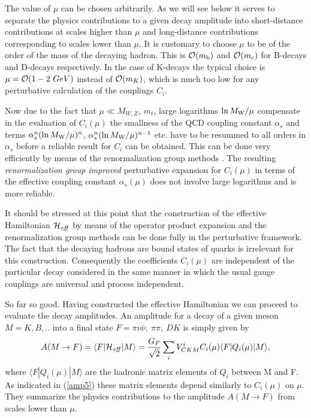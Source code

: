 \documentclass[12pt]{article}
\newcommand{\mc}{m_{\rm c}}
\newcommand{\mb}{m_{\rm b}}
\newcommand{\mw}{M_{\rm W}}
\newcommand{\be}{\begin{equation}}
\newcommand{\ee}{\end{equation}}
\newcommand{\ord}{{\cal O}}
\begin{document}
The value of $\mu$ can be chosen arbitrarily. As we will see below it serves 
to separate the physics contributions to a given decay amplitude into
short-distance contributions at scales higher than $\mu$ and long-distance
contributions corresponding to scales lower than $\mu$. It is customary 
to choose
$\mu$ to be of the order of the mass of the decaying hadron. 
This is $\ord (\mb)$ and $\ord(\mc)$ for B-decays and
D-decays respectively. In the case of K-decays the typical choice is
 $\mu=\ord(1-2~GeV)$
instead of $\ord(m_K)$, which is much too low for any perturbative 
calculation of the couplings $C_i$.

Now due to the fact that $\mu\ll  M_{W,Z},~ m_t$, large logarithms 
$\ln\mw/\mu$ compensate in the evaluation of
$C_i(\mu)$ the smallness of the QCD coupling constant $\alpha_s$ and 
terms $\alpha^n_s (\ln\mw/\mu)^n$, $\alpha^n_s (\ln\mw/\mu)^{n-1}$ 
etc. have to be resummed to all orders in $\alpha_s$ before a reliable 
result for $C_i$ can be obtained.
This can be done very efficiently by means of the renormalization group
methods \cite{REGM,HV1,Weinberg}. 
The resulting {\it renormalization group improved} perturbative
expansion for $C_i(\mu)$ in terms of the effective coupling constant 
$\alpha_s(\mu)$ does not involve large logarithms and is more reliable.

It should be stressed at this point that the construction of the effective
Hamiltonian ${\cal H}_{\it eff}$ by means of the operator product expansion and 
the
renormalization group methods can be done fully in the perturbative framework.
The fact that the decaying hadrons are bound states of quarks is irrelevant
for this construction. Consequently the coefficients $C_i(\mu)$ are 
independent of the
particular decay considered in the same manner in which the usual gauge
couplings are universal and process independent.

So far so good. Having constructed the effective Hamiltonian we can proceed
to evaluate the decay amplitudes. An amplitude for a decay of a given meson 
$M= K, B,..$ into a final state $F=\pi\nu\bar\nu,~\pi\pi,~DK$ is simply 
given by
\be\label{amp5}
A(M\to F)=\langle F|{\cal H}_{\it eff}|M\rangle
=\frac{G_F}{\sqrt{2}}\sum_i V^i_{CKM}C_i(\mu)\langle F|Q_i(\mu)|M\rangle,
\ee
where $\langle F|Q_i(\mu)|M\rangle$ 
are the hadronic matrix elements of $Q_i$ between M and F. As indicated
in (\ref{amp5}) these matrix elements depend similarly to $C_i(\mu)$ 
on $\mu$. They summarize the physics contributions to the amplitude 
$A(M\to F)$ from scales lower than $\mu$.
\end{document}
